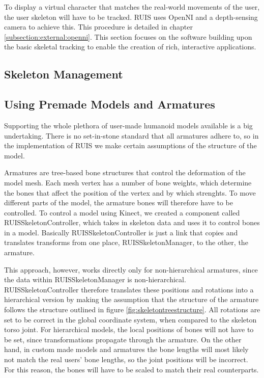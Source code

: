 \documentclass[12pt,a4paper,oneside,pdftex]{report}
\begin{document}
To display a virtual character that matches the real-world movements of the user, the user skeleton will have to be tracked. RUIS uses OpenNI and a depth-sensing camera to achieve this. This procedure is detailed in chapter \ref{subsection:external:openni}. This section focuses on the software building upon the basic skeletal tracking to enable the creation of rich, interactive applications. 

\subsection{Skeleton Management}
\label{subsection:skeletontracking:skeletonmanagement}

\subsection{Using Premade Models and Armatures}
\label{subsection:skeletontracking:premademodels}

Supporting the whole plethora of user-made humanoid models available is a big undertaking. There is no set-in-stone standard that all armatures adhere to, so in the implementation of RUIS we make certain assumptions of the structure of the model.

Armatures are tree-based bone structures that control the deformation of the model mesh. Each mesh vertex has a number of bone weights, which determine the bones that affect the position of the vertex and by which strenghts. To move different parts of the model, the armature bones will therefore have to be controlled. To control a model using Kinect, we created a component called RUISSkeletonController, which takes in skeleton data and uses it to control bones in a model. Basically RUISSkeletonController is just a link that copies and translates transforms from one place, RUISSkeletonManager, to the other, the armature.

This approach, however, works directly only for non-hierarchical armatures, since the data within RUISSkeletonManager is non-hierarchical. RUISSkeletonController therefore translates these positions and rotations into a hierarchical version by making the assumption that the structure of the armature follows the structure outlined in figure \ref{fig:skeletontreestructure}. All rotations are set to be correct in the global coordinate system, when compared to the skeleton torso joint. For hierarchical models, the local positions of bones will not have to be set, since transformations propagate through the armature. On the other hand, in custom made models and armatures the bone lengths will most likely not match the real users' bone lengths, so the joint positions will be incorrect. For this reason, the bones will have to be scaled to match their real counterparts.
\end{document}
